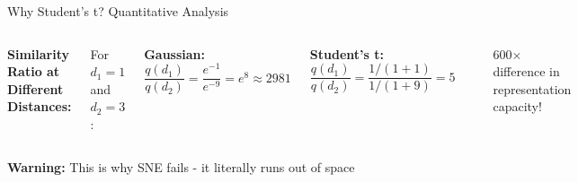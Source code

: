 \documentclass[aspectratio=169]{beamer}
\newcommand{\warning}[1]{\colorbox{red!10}{\textcolor{warningcolor}{\textbf{Warning:} #1}}}
\begin{document}
\begin{frame}{Why Student's t? Quantitative Analysis}
\begin{columns}
\textbf{Similarity Ratio at Different Distances:}

For $d_1 = 1$ and $d_2 = 3$:

\textbf{Gaussian:}
$$\frac{q(d_1)}{q(d_2)} = \frac{e^{-1}}{e^{-9}} = e^8 \approx 2981$$

\textbf{Student's t:}
$$\frac{q(d_1)}{q(d_2)} = \frac{1/(1+1)}{1/(1+9)} = 5$$

\includegraphics[width=\textwidth]{./Figures/distance_ratio_plot.png}

\colorbox{yellow!30}{600× difference in\\representation capacity!}
\end{columns}

\warning{This is why SNE fails - it literally runs out of space}
\end{frame}
\end{document}
